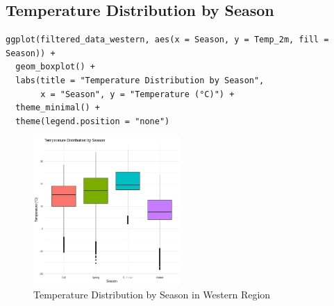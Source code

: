 \subsection*{Temperature Distribution by Season}

\begin{verbatim}
ggplot(filtered_data_western, aes(x = Season, y = Temp_2m, fill = Season)) +
  geom_boxplot() +
  labs(title = "Temperature Distribution by Season",
       x = "Season", y = "Temperature (°C)") +
  theme_minimal() +
  theme(legend.position = "none")
\end{verbatim}

\begin{figure}[h]
    \centering
    \includegraphics[width=0.5\textwidth]{figures/box_west.jpg}
    \caption{Temperature Distribution by Season in Western Region}
\end{figure}

